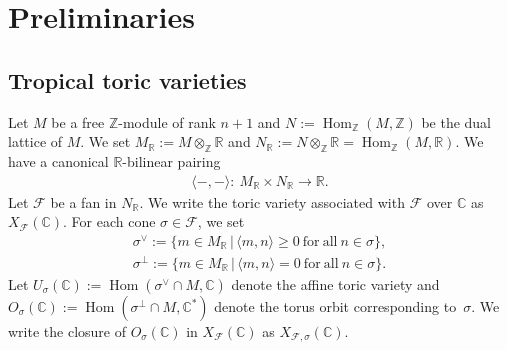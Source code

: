 \documentclass[pdftex]{sigma}
\numberwithin{equation}{section}
\begin{document}
\section{Preliminaries}\label{sc:2}

\subsection{Tropical toric varieties}

Let $M$ be a free ${\mathbb Z}$-module of rank $n+1$ and $N:=\operatorname{Hom}_{\mathbb Z} (M,{\mathbb Z})$ be the dual lattice of $M$.
We set $M_{\mathbb R}:=M \otimes_{\mathbb Z} {\mathbb R}$ and $N_{\mathbb R}:=N \otimes_{\mathbb Z} {\mathbb R}=\operatorname{Hom}_{\mathbb Z} (M,{\mathbb R})$. We have a canonical ${\mathbb R}$-bilinear pairing
\begin{gather*}
\langle - ,- \rangle \colon \ M_{\mathbb R} \times N_{\mathbb R} \to {\mathbb R}.
\end{gather*}
Let ${\mathcal F}$ be a fan in $N_{\mathbb R}$. We write the toric variety associated with ${\mathcal F}$ over ${\mathbb C}$ as $X_{\mathcal F}({\mathbb C})$.
For each cone $\sigma \in {\mathcal F}$, we set
\begin{gather*}
\sigma^\vee := \{ m \in M_{\mathbb R} \,|\, \langle m,n \rangle \geq 0 \mathrm{\ for\ all\ } n \in \sigma \},\\
\sigma^\perp := \{ m \in M_{\mathbb R} \,|\, \langle m,n \rangle =0 \mathrm{\ for\ all\ } n \in \sigma \}.
\end{gather*}
Let $U_\sigma({\mathbb C}):=\operatorname{Hom}(\sigma^\vee \cap M, {\mathbb C})$ denote the af\/f\/ine toric variety and $O_\sigma({\mathbb C}):=\operatorname{Hom} ( \sigma^{\perp} \cap M, {\mathbb C}^\ast )$ denote the torus orbit corresponding to~$\sigma$. We write the closure of $O_\sigma({\mathbb C})$ in $X_{\mathcal F}({\mathbb C})$ as $X_{{\mathcal F},\sigma}({\mathbb C})$.
\end{document}
